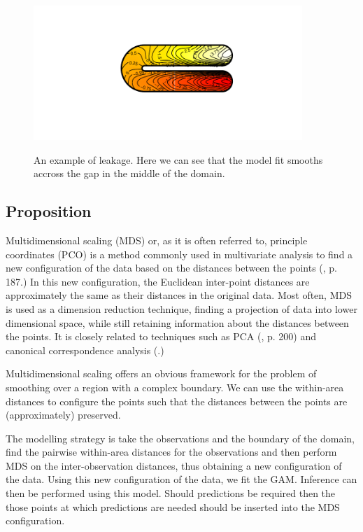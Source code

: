\documentclass[a4paper,10pt]{article}
\begin{document}
\begin{figure}
\centering
\includegraphics[trim=0.5in 1in 0in 1in, width=4in]{figs/leakageexample.pdf} \\
\caption{An example of leakage. Here we can see that the model fit smooths accross the gap in the middle of the domain.}
\label{leakage}
\end{figure}


\subsection{Proposition}

Multidimensional scaling (MDS) or, as it is often referred to, principle coordinates (PCO) is a method commonly used in multivariate analysis to find a new configuration of the data based on the distances between the points (\cite{chatfieldcollins}, p. 187.) In this new configuration, the Euclidean inter-point distances are approximately the same as their distances in the original data. Most often, MDS is used as a dimension reduction technique, finding a projection of data into lower dimensional space, while still retaining information about the distances between the points. It is closely related to techniques such as PCA (\cite{chatfieldcollins}, p. 200) and canonical correspondence analysis (\cite{terbraak}.)

Multidimensional scaling offers an obvious framework for the problem of smoothing over a region with a complex boundary. We can use the within-area distances to configure the points such that the distances between the points are (approximately) preserved.

The modelling strategy is take the observations and the boundary of the domain, find the pairwise within-area distances for the observations and then perform MDS on the inter-observation distances, thus obtaining a new configuration of the data. Using this new configuration of the data, we fit the GAM. Inference can then be performed using this model. Should predictions be required then the those points at which predictions are needed should be inserted into the MDS configuration.
\end{document}

